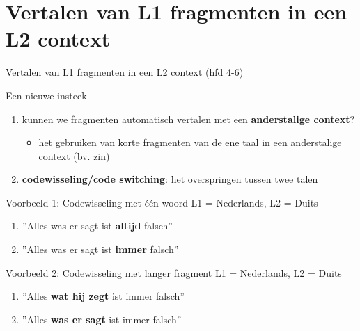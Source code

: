 \documentclass[8pt]{beamer}
\begin{document}
\section{Vertalen van L1 fragmenten in een L2 context}

\begin{frame}{Vertalen van L1 fragmenten in een L2 context (hfd 4-6)}
    \begin{block}{Een nieuwe insteek}
        \begin{enumerate}
            \item kunnen we fragmenten automatisch vertalen met een \textbf{anderstalige context}?
            \begin{itemize}
            \item het gebruiken van korte fragmenten van de ene taal in een anderstalige context (bv. zin)
            \end{itemize}
            \item \textbf{codewisseling/code switching}: het overspringen tussen twee talen
        \end{enumerate}
    \end{block}

    \begin{block}{Voorbeeld 1: Codewisseling met één woord}
        L1 = Nederlands, L2 = Duits
        \begin{enumerate}
            \item ''Alles was er sagt ist \textbf{altijd} falsch''
            \item ''Alles was er sagt ist \textbf{immer} falsch''
        \end{enumerate}
    \end{block}

    \begin{block}{Voorbeeld 2: Codewisseling met langer fragment}
        L1 = Nederlands, L2 = Duits
        \begin{enumerate}
            \item ''Alles \textbf{wat hij zegt} ist immer falsch''
            \item ''Alles \textbf{was er sagt} ist immer falsch''
        \end{enumerate}
    \end{block}
\end{frame}
\end{document}
